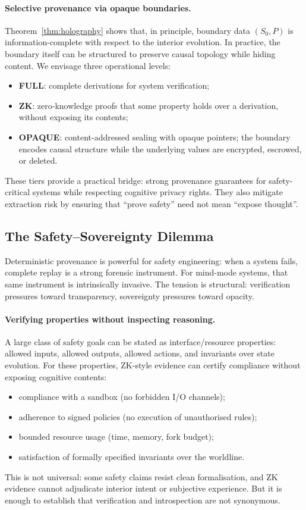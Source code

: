 \documentclass[11pt]{article}
\theoremstyle{definition}
\theoremstyle{plain}
\theoremstyle{remark}
\begin{document}
\paragraph{Selective provenance via opaque boundaries.}
Theorem~\ref{thm:holography} shows that, in principle, boundary data
$(S_0,P)$ is information-complete with respect to the interior
evolution.
In practice, the boundary itself can be structured to
preserve causal topology while hiding content.  We envisage three
operational levels:
\begin{itemize}[leftmargin=*]
  \item \textbf{FULL}: complete derivations for system verification;
  \item \textbf{ZK}: zero-knowledge proofs that some property holds
    over a derivation, without exposing its contents;
  \item \textbf{OPAQUE}: content-addressed sealing with opaque
    pointers; the boundary encodes causal structure while the underlying
    values are encrypted, escrowed, or deleted.
\end{itemize}
These tiers provide a practical bridge: strong provenance guarantees for
safety-critical systems while respecting cognitive privacy rights.
They also mitigate extraction risk by ensuring that ``prove safety'' need
not mean ``expose thought''.

\subsection{The Safety--Sovereignty Dilemma}
\label{sec:dilemma}

Deterministic provenance is powerful for safety engineering: when a system fails, complete replay is a strong forensic instrument.
For mind-mode systems, that same instrument is intrinsically invasive.
The tension is structural: verification pressures toward transparency, sovereignty pressures toward opacity.

\paragraph{Verifying properties without inspecting reasoning.}
A large class of safety goals can be stated as interface/resource properties:
allowed inputs, allowed outputs, allowed actions, and invariants over state evolution.
For these properties, ZK-style evidence can certify compliance without exposing cognitive contents:
\begin{itemize}[leftmargin=*]
  \item compliance with a sandbox (no forbidden I/O channels);
  \item adherence to signed policies (no execution of unauthorised rules);
  \item bounded resource usage (time, memory, fork budget);
  \item satisfaction of formally specified invariants over the worldline.
\end{itemize}
This is not universal: some safety claims resist clean formalisation, and ZK evidence cannot adjudicate interior intent or subjective experience.
But it is enough to establish that verification and introspection are not synonymous.
\end{document}
